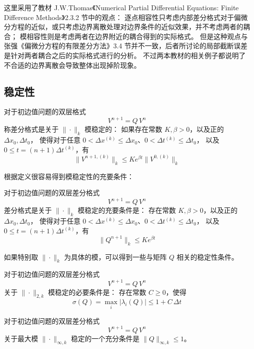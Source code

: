 \begin{remark}
    这里采用了教材 J.W.Thomas《Numerical Partial Differential Equations: Finite Difference Methods》2.3.2 节中的观点：
    逐点相容性只考虑内部差分格式对于偏微分方程的近似，或只考虑边界离散处理对边界条件的近似效果，并不考虑两者的耦合；
    模相容性则是考虑两者在边界附近的耦合得到的实际格式。
    但是这种观点与张强《偏微分方程的有限差分方法》3.4 节并不一致，后者所讨论的局部截断误差是针对两者耦合之后的实际格式进行的分析。
    不过两本教材的相关例子都说明了不合适的边界离散会导致整体出现掉阶现象。
\end{remark}

\subsection{稳定性}

\begin{definition}[模稳定性]
    对于初边值问题的双层格式
    \[
        V^{n+1} = Q \, V^{n}
    \]
    称差分格式是关于 $\|\cdot\|_k$ 模稳定的：
    如果存在常数 $K,\beta > 0$，以及正的 $\Delta x_0,\Delta t_0$，
    使得对于任意 $0 < \Delta x^{(k)} \le \Delta x_0$、$0 < \Delta t^{(k)} \le \Delta t_0$，
    以及 $0 \le t = (n+1)\Delta t^{(k)}$，有
    \[
        \|V^{n+1,(k)}\|_{k} \le K e^{\beta t} \| V^{0,(k)}\|_k
    \]
\end{definition}

根据定义很容易得到模稳定性的充要条件：
\begin{theorem}
    对于初边值问题的双层差分格式
    \[
        V^{n+1} = Q \, V^{n}
    \]
    差分格式是关于 $\|\cdot\|_k$ 模稳定的充要条件是：
    存在常数 $K,\beta > 0$，以及正的 $\Delta x_0,\Delta t_0$，
    使得对于任意 $0 < \Delta x^{(k)} \le \Delta x_0$、$0 < \Delta t^{(k)} \le \Delta t_0$，
    以及 $0 \le t = (n+1)\Delta t^{(k)}$，有
    \[
        \|Q^{n+1}\|_{k} \le K e^{\beta t}
    \]
\end{theorem}

如果特别取 $\|\cdot\|_k$ 为具体的模，可以得到一些与矩阵 $Q$ 相关的稳定性条件。

\begin{theorem}
    对于初边值问题的双层差分格式
    \[
        V^{n+1} = Q \, V^{n}
    \]
    关于 $\|\cdot\|_{2,k}$ 模稳定的必要条件是：
    存在常数 $C \ge 0$，使得
    \[
        \sigma(Q) = \max_i|\lambda_i(Q)| \le 1 + C\,\Delta t
    \]
\end{theorem}

\begin{theorem}
    对于初边值问题的双层差分格式
    \[
        V^{n+1} = Q \, V^{n}
    \]
    关于最大模 $\|\cdot\|_{\infty,k}$ 稳定的一个充分条件是 $\|Q\|_{\infty,k} \le 1$。
\end{theorem}

